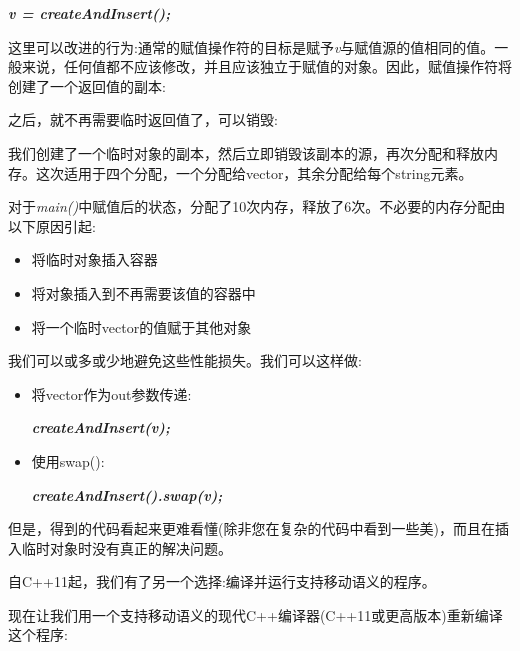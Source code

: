\begin{itemize}
  \textbf{\textit{v =\allowbreak{} createAndInsert(\allowbreak{})\allowbreak{};}}\par
  这里可以改进的行为:通常的赋值操作符的目标是赋予\textit{v}与赋值源的值相同的值。一般来说，任何值都不应该修改，并且应该独立于赋值的对象。因此，赋值操作符将创建了一个返回值的副本:\par
{}
  之后，就不再需要临时返回值了，可以销毁:\par
{}
  我们创建了一个临时对象的副本，然后立即销毁该副本的源，再次分配和释放内存。这次适用于四个分配，一个分配给vector，其余分配给每个string元素。
\end{itemize}

对于\textit{main()}中赋值后的状态，分配了10次内存，释放了6次。不必要的内存分配由以下原因引起:\par

\begin{itemize}
  \item 将临时对象插入容器
  \item 将对象插入到不再需要该值的容器中
  \item 将一个临时vector的值赋于其他对象
\end{itemize}

我们可以或多或少地避免这些性能损失。我们可以这样做:\par

\begin{itemize}
  \item 将vector作为out参数传递:\par
  \textit{\textbf{createAndInsert(v); {\color{mygreen}{// let the function fill vector v}}}}
  \item 使用swap():\par
  \textit{\textbf{createAndInsert(\allowbreak{})\allowbreak{}.swap(\allowbreak{}v)\allowbreak{};}}
\end{itemize}

但是，得到的代码看起来更难看懂(除非您在复杂的代码中看到一些美)，而且在插入临时对象时没有真正的解决问题。\par

自C++11起，我们有了另一个选择:编译并运行支持移动语义的程序。\par


现在让我们用一个支持移动语义的现代C++编译器(C++11或更高版本)重新编译这个程序:\par

